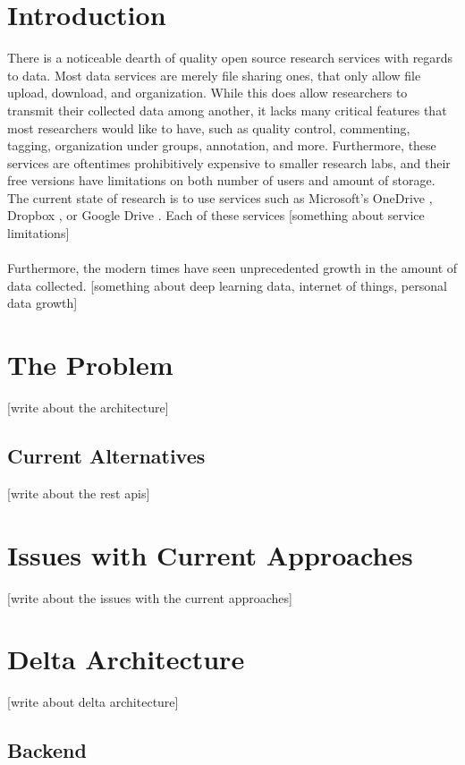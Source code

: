 \documentclass[conference]{IEEEtran}
\begin{document}
\section{Introduction}
There is a noticeable dearth of quality open source research services with regards to data.
Most data services are merely file sharing ones, that only allow file upload, download, and organization.
While this does allow researchers to transmit their collected data among another, 
it lacks many critical features that most researchers would like to have, such as 
quality control, commenting, tagging, organization under groups, annotation, and more.
Furthermore, these services are oftentimes prohibitively expensive to smaller research labs, and their
free versions have limitations on both number of users and amount of storage. 
The current state of research is to use services such as Microsoft's OneDrive \cite{onedrive}, Dropbox \cite{dropbox},
or Google Drive \cite{googledrive}. Each of these services 
[something about service limitations]
\\\\
Furthermore, the modern times have seen unprecedented growth in the amount of data collected.
[something about deep learning data, internet of things, personal data growth]

\section{The Problem}
[write about the architecture]

\subsection{Current Alternatives}
[write about the rest apis]

\section{Issues with Current Approaches}
[write about the issues with the current approaches]

\section{Delta Architecture}
[write about delta architecture]

\subsection{Backend}
\end{document}
